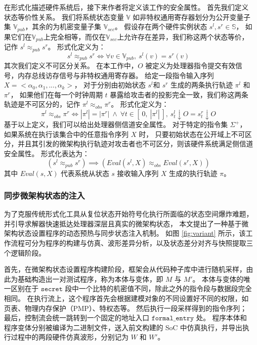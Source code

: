 在形式化描述硬件系统后，接下来作者将定义该工作的安全属性。
首先我们定义状态等价性关系。
我们将系统状态变量 $\mathbb{V}$ 如非特权通用寄存器划分为公开变量子集 $\mathbb{V}_{pub}$，其余的为机密变量子集 $\mathbb{V}_{sec}$。
假设存在两个硬件实例状态 $s^l, s^r \in \mathbb{S}$，
如果它们在$\mathbb{V}_{pub}$上完全相等，而仅在$\mathbb{V}_{sec}$上允许存在差异，我们称这两个状态等价，记作 $s^l \approx_{pub} s^r$。
形式化定义为：
$$s^l \approx_{pub} s^r \iff \forall v \in \mathbb{V}_{pub},\ s^l(v)=s^r(v)$$
其次我们定义不可区分关系。
在本工作中，$O$ 被定义为处理器指令提交有效信号，内存总线访存信号与非特权通用寄存器。
给定一段指令输入序列 $X=<\alpha_0, \alpha_1, ..., \alpha_k>$，
对于分别由初始状态 $s^l$和 $s^r$ 生成的两条执行轨迹 $\pi^l$ 和 $\pi^r$，
如果他们在每一个时钟周期 $t$ 暴露给攻击者的投影完全一致，我们称这两条轨迹是不可区分的，记作 $\pi^l \approx_{obs} \pi^r$。
形式化定义为：
$$\pi^l \approx_{obs} \pi^r \iff |\pi^l|=|\pi^r|\ \land\ \forall t \in [\ 0,\ |\pi^l|\ ],\ s^l_t\downarrow O=s^r_t\downarrow O$$
基于以上定义，我们可以给出处理器侧信道安全属性。
对于特定的指令集 $\Sigma^+$，如果系统在执行该集合中的任意指令序列 $X$ 时，
只要初始状态在公开域上不可区分，并且其引发的微架构执行轨迹对攻击者也不可区分，则该硬件系统满足侧信道安全属性。
形式化表达为：
$$(s^l\approx_{pub} s^r) \implies (Eval(s^l, X)\approx_{obs}Eval(s^r, X))$$
其中 $Eval(s, X)$ 代表系统从状态 $s$ 接收输入序列 $X$ 生成的执行轨迹 $\pi$。

\subsubsection{同步微架构状态的注入}

为了克服传统形式化工具从复位状态开始符号化执行所面临的状态空间爆炸难题，并引导求解器快速抵达处理器深层且真实的微架构状态，
本文提出了一种基于微架构状态设置程序的动态预热与同步状态注入机制。
如图 \ref{fig:variant} 所示，该工作流程可分为程序的构建与仿真、波形差异分析，以及状态差分对齐与快照提取三个逻辑阶段。

首先，在微架构状态设置程序构建阶段，框架会从代码种子库中进行随机采样，由此为基础构造出一对测试程序，称为本体与变体，即 $M$ 与 $M'$。
本体与变体的唯一区别在于 $\texttt{secret}$ 段中一个比特的机密值不同，除此之外的指令段与数据段完全相同。
在执行流上，这个程序首先会根据建模对象的不同设置好不同的权限，如页表、物理内存保护（PMP）、特权态等。
然后执行一段采样得到的指令序列；最后，控制流会统一跳转到一个固定的地址入口 $\texttt{formal\_entry}$ 处。
程序本体和程序变体分别被编译为二进制文件，送入前文构建的 SoC 中仿真执行，并导出执行过程中的两段硬件仿真波形，分别记为 $W$ 和 $W'$。

